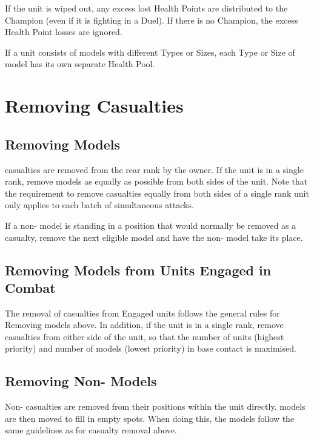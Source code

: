 If the unit is wiped out, any excess lost Health Points are distributed to the Champion (even if it is fighting in a Duel). If there is no Champion, the excess Health Point losses are ignored.

If a unit consists of \rnf{} models with different Types or Sizes, each Type or Size of \rnf{} model has its own separate Health Pool.

\section{Removing Casualties}
\label{removing_casualties}

\subsection{Removing \rnf{} Models}

\rnf{} casualties are removed from the rear rank by the owner. If the unit is in a single rank, remove models as equally as possible from both sides of the unit. Note that the requirement to remove casualties equally from both sides of a single rank unit only applies to each batch of simultaneous attacks.

If a non-\rnf{} model is standing in a position that would normally be removed as a casualty, remove the next eligible \rnf{} model and have the non-\rnf{} model take its place.

\subsection{Removing \rnf{} Models from Units Engaged in Combat}

The removal of casualties from Engaged units follows the general rules for Removing \rnf{} models above. In addition, if the unit is in a single rank, remove casualties from either side of the unit, so that the number of units (highest priority) and number of models (lowest priority) in base contact is maximised. 

 \subsection{Removing Non-\rnf{} Models}
 
Non-\rnf{} casualties are removed from their positions within the unit directly. \rnf{} models are then moved to fill in empty spots. When doing this, the models follow the same guidelines as for casualty removal above.
